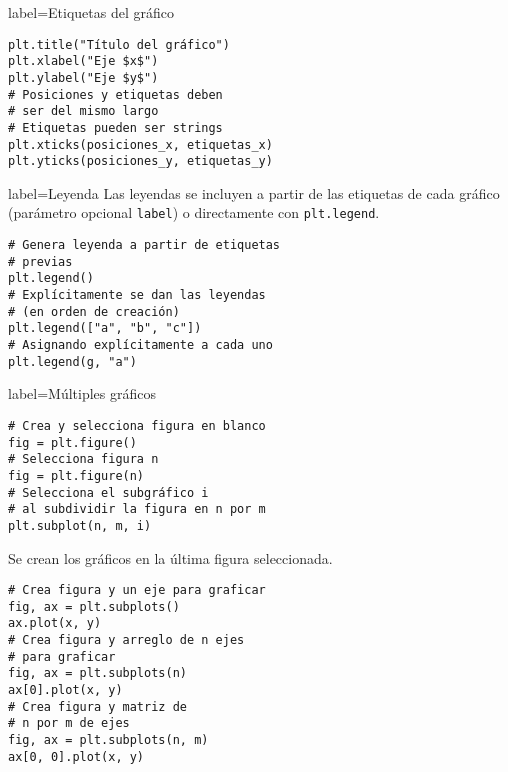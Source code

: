 \begin{contentbox}{label=Etiquetas del gráfico}
\begin{lstlisting}
plt.title("Título del gráfico")
plt.xlabel("Eje $x$")
plt.ylabel("Eje $y$")
# Posiciones y etiquetas deben
# ser del mismo largo
# Etiquetas pueden ser strings
plt.xticks(posiciones_x, etiquetas_x)
plt.yticks(posiciones_y, etiquetas_y)
\end{lstlisting}
\end{contentbox}

\begin{contentbox}{label=Leyenda}
    Las leyendas se incluyen a partir de las etiquetas de cada gráfico (parámetro opcional \lstinline!label!) o directamente con \lstinline!plt.legend!.
    
\begin{lstlisting}
# Genera leyenda a partir de etiquetas
# previas
plt.legend()
# Explícitamente se dan las leyendas
# (en orden de creación)
plt.legend(["a", "b", "c"])
# Asignando explícitamente a cada uno
plt.legend(g, "a")
\end{lstlisting}
\end{contentbox}

\begin{contentbox}{label=Múltiples gráficos}
\begin{lstlisting}
# Crea y selecciona figura en blanco
fig = plt.figure()
# Selecciona figura n
fig = plt.figure(n)
# Selecciona el subgráfico i
# al subdividir la figura en n por m
plt.subplot(n, m, i)
\end{lstlisting}
    Se crean los gráficos en la última figura seleccionada.
\begin{lstlisting}
# Crea figura y un eje para graficar
fig, ax = plt.subplots()
ax.plot(x, y)
# Crea figura y arreglo de n ejes
# para graficar
fig, ax = plt.subplots(n)
ax[0].plot(x, y)
# Crea figura y matriz de
# n por m de ejes
fig, ax = plt.subplots(n, m)
ax[0, 0].plot(x, y)
\end{lstlisting}
\end{contentbox}
